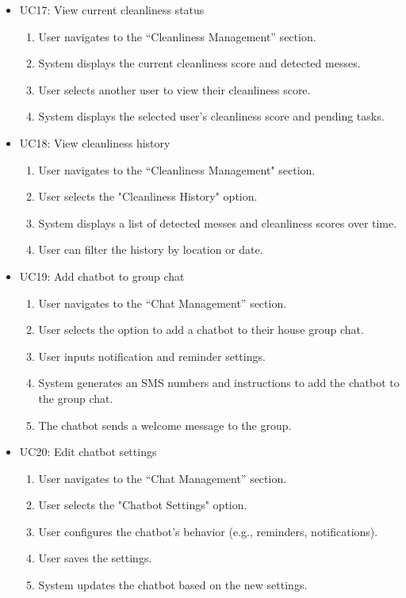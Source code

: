 \documentclass{scrreprt}
\theoremstyle{definition}
\begin{document}
\begin{itemize}
    \item UC17: View current cleanliness status
    \begin{enumerate}
        \item User navigates to the “Cleanliness Management” section.
        \item System displays the current cleanliness score and detected messes.
        \item User selects another user to view their cleanliness score.
        \item System displays the selected user’s cleanliness score and pending tasks.
    \end{enumerate}
    
    \item UC18: View cleanliness history
    \begin{enumerate}
        \item User navigates to the “Cleanliness Management" section.
        \item User selects the "Cleanliness History" option.
        \item System displays a list of detected messes and cleanliness scores over time.
        \item User can filter the history by location or date.
    \end{enumerate}
    
    \item UC19: Add chatbot to group chat
    \begin{enumerate}
        \item User navigates to the “Chat Management” section.
        \item User selects the option to add a chatbot to their house group chat.
        \item User inputs notification and reminder settings.
        \item System generates an SMS numbers and instructions to add the chatbot to the group chat.
        \item The chatbot sends a welcome message to the group.
    \end{enumerate}
    
    \item UC20: Edit chatbot settings
    \begin{enumerate}
        \item User navigates to the “Chat Management” section.
        \item User selects the "Chatbot Settings" option.
        \item User configures the chatbot’s behavior (e.g., reminders, notifications).
        \item User saves the settings.
        \item System updates the chatbot based on the new settings.
    \end{enumerate}
    
\end{itemize}
    
\end{document}
